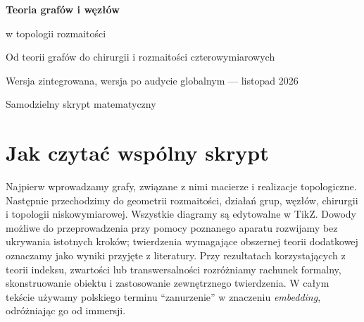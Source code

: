 \documentclass[11pt,a4paper]{report}
\numberwithin{equation}{section}
\theoremstyle{plain}
\theoremstyle{definition}
\theoremstyle{remark}
\begin{document}
\hypersetup{pageanchor=false}
\begin{titlepage}
\centering
\vspace*{3.6cm}
{\Huge\bfseries Teoria grafów i węzłów\par}
\vspace{0.45cm}
{\Large w topologii rozmaitości\par}
\vspace{0.9cm}
{\Large\color{blue!45!black} Od teorii grafów do chirurgii i rozmaitości czterowymiarowych\par}
\vfill
{\large Wersja zintegrowana, wersja po audycie globalnym — listopad 2026\par}
\vspace{1cm}
{\large Samodzielny skrypt matematyczny\par}
\end{titlepage}
\tableofcontents
\clearpage
{}
\hypersetup{pageanchor=true}

\chapter*{Jak czytać wspólny skrypt}
Najpierw wprowadzamy grafy, związane z nimi macierze i realizacje topologiczne.
Następnie przechodzimy do geometrii rozmaitości, działań grup,
węzłów, chirurgii i topologii niskowymiarowej.
Wszystkie diagramy są edytowalne w TikZ. Dowody możliwe do przeprowadzenia
przy pomocy poznanego aparatu rozwijamy bez ukrywania istotnych kroków;
twierdzenia wymagające obszernej teorii dodatkowej oznaczamy jako
wyniki przyjęte z literatury. Przy rezultatach korzystających z teorii
indeksu, zwartości lub transwersalności rozróżniamy rachunek formalny,
skonstruowanie obiektu i zastosowanie zewnętrznego twierdzenia.
W całym tekście używamy polskiego terminu ``zanurzenie'' w znaczeniu
\emph{embedding}, odróżniając go od immersji.
\end{document}
